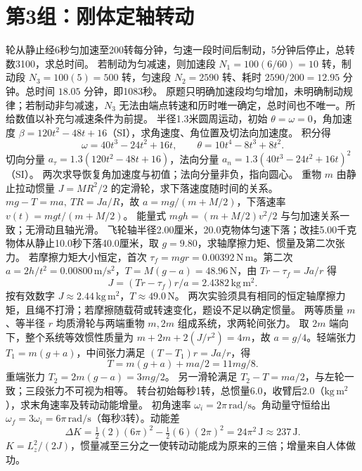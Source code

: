 \section{第3组：刚体定轴转动}
\problemtext 轮从静止经6秒匀加速至200转每分钟，匀速一段时间后制动，5分钟后停止，总转数3100，求总时间。
\workings 若制动为匀减速，则加速段 $N_1=100(6/60)=10$ 转，制动段 $N_3=100(5)=500$ 转，匀速段 $N_2=2590$ 转、耗时 $2590/200=12.95$ 分钟。总时间 $18.05$ 分钟，即1083秒。
\crosscheck 原题只明确加速段均匀增加，未明确制动规律；若制动非匀减速，$N_3$ 无法由端点转速和历时唯一确定，总时间也不唯一。所给数值以补充匀减速条件为前提。
\problemtext 半径1.3米圆周运动，初始 $\theta=\omega=0$，角加速度 $\beta=120t^2-48t+16$（SI），求角速度、角位置及切法向加速度。
\workings 积分得
\[
\omega=40t^3-24t^2+16t,\qquad \theta=10t^4-8t^3+8t^2.
\]
切向分量 $a_\tau=1.3(120t^2-48t+16)$，法向分量 $a_n=1.3(40t^3-24t^2+16t)^2$（SI）。
\crosscheck 两次求导恢复角加速度与初值；法向分量非负，指向圆心。
\problemtext 重物 $m$ 由静止拉动惯量 $J=MR^2/2$ 的定滑轮，求下落速度随时间的关系。
\workings $mg-T=ma,\ TR=J a/R$，故 $a=mg/(m+M/2)$，下落速率 $v(t)=mgt/(m+M/2)$。
\crosscheck 能量式 $mgh=(m+M/2)v^2/2$ 与匀加速关系一致；无滑动且轴光滑。
\problemtext 飞轮轴半径2.00厘米，20.0克物体匀速下落；改挂5.00千克物体从静止10.0秒下落40.0厘米，取 $g=9.80$，求轴摩擦力矩、惯量及第二次张力。
\workings 若摩擦力矩大小恒定，首次 $\tau_f=mg r=0.00392\,\mathrm{N\,m}$。第二次 $a=2h/t^2=0.00800\,\mathrm{m/s^2}$，$T=M(g-a)=48.96\,\mathrm N$，由 $Tr-\tau_f=J a/r$ 得
\[
J=(Tr-\tau_f)r/a=2.4382\,\mathrm{kg\,m^2}.
\]
按有效数字 $J\approx2.44\,\mathrm{kg\,m^2}$，$T\approx49.0\,\mathrm N$。
\crosscheck 两次实验须具有相同的恒定轴摩擦力矩，且绳不打滑；若摩擦随载荷或转速变化，题设不足以确定惯量。
\problemtext 两等质量 $m$、等半径 $r$ 均质滑轮与两端重物 $m,2m$ 组成系统，求两轮间张力。
\workings 取 $2m$ 端向下，整个系统等效惯性质量为 $m+2m+2(J/r^2)=4m$，故 $a=g/4$。轻端张力 $T_1=m(g+a)$，中间张力满足 $(T-T_1)r=J a/r$，得
\[
T=m(g+a)+ma/2=11mg/8.
\]
重端张力 $T_2=2m(g-a)=3mg/2$。
\crosscheck 另一滑轮满足 $T_2-T=ma/2$，与左轮一致；三段张力不可视为相等。
\problemtext 转台初始每秒1转，总惯量6.0，收臂后2.0（$\mathrm{kg\,m^2}$），求末角速率及转动动能增量。
\workings 初角速率 $\omega_i=2\pi\,\mathrm{rad/s}$。角动量守恒给出 $\omega_f=3\omega_i=6\pi\,\mathrm{rad/s}$（每秒3转）。动能差
\[
\Delta K=\tfrac12(2)(6\pi)^2-\tfrac12(6)(2\pi)^2=24\pi^2\,\mathrm J\approx237\,\mathrm J.
\]
\crosscheck $K=L_z^2/(2J)$，惯量减至三分之一使转动动能成为原来的三倍；增量来自人体做功。
